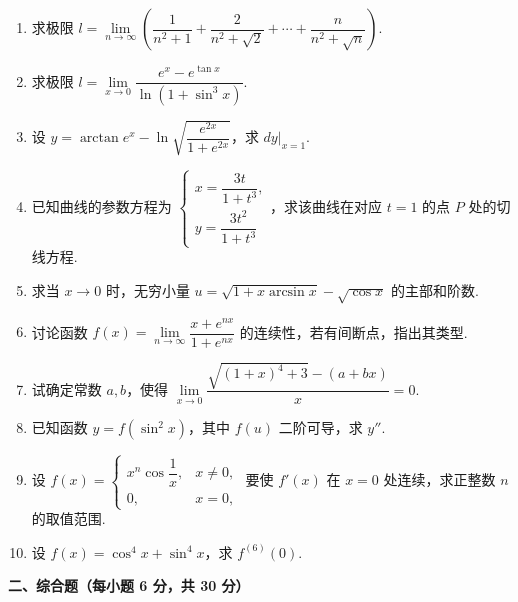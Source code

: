 \documentclass[a4paper,11pt]{ctexart}
\begin{document}
\begin{enumerate}[label=\arabic*., leftmargin=2em, itemsep=1.05em, topsep=0.5em]
  \item 求极限 $l = \lim\limits_{n\to\infty}\left(\dfrac{1}{n^2+1} + \dfrac{2}{n^2+\sqrt{2}} + \cdots + \dfrac{n}{n^2+\sqrt{n}}\right)$.

  \item 求极限 $l = \lim\limits_{x\to 0}\dfrac{e^x - e^{\tan x}}{\ln(1+\sin^3 x)}$.

  \item 设 $y = \arctan e^x - \ln\sqrt{\dfrac{e^{2x}}{1+e^{2x}}}$，求 $\left.dy\right|_{x=1}$.

  \item 已知曲线的参数方程为 $\begin{cases} x = \dfrac{3t}{1+t^3}, \\[0.5em] y = \dfrac{3t^2}{1+t^3} \end{cases}$，求该曲线在对应 $t=1$ 的点 $P$ 处的切线方程.

  \item 求当 $x\to 0$ 时，无穷小量 $u = \sqrt{1+x\arcsin x} - \sqrt{\cos x}$ 的主部和阶数.

  \item 讨论函数 $f(x) = \lim\limits_{n\to\infty}\dfrac{x+e^{nx}}{1+e^{nx}}$ 的连续性，若有间断点，指出其类型.

  \item 试确定常数 $a,b$，使得 $\lim\limits_{x\to 0}\dfrac{\sqrt{(1+x)^4+3}-(a+bx)}{x} = 0$.

  \item 已知函数 $y = f(\sin^2 x)$，其中 $f(u)$ 二阶可导，求 $y''$.

  \item 设 $f(x) = \begin{cases} x^n\cos\dfrac{1}{x}, & x\neq 0, \\ 0, & x=0, \end{cases}$ 要使 $f'(x)$ 在 $x=0$ 处连续，求正整数 $n$ 的取值范围.

  \item 设 $f(x) = \cos^4 x + \sin^4 x$，求 $f^{(6)}(0)$.
\end{enumerate}

\vspace{1.0em}
\textbf{二、综合题（每小题 6 分，共 30 分）}
\end{document}
